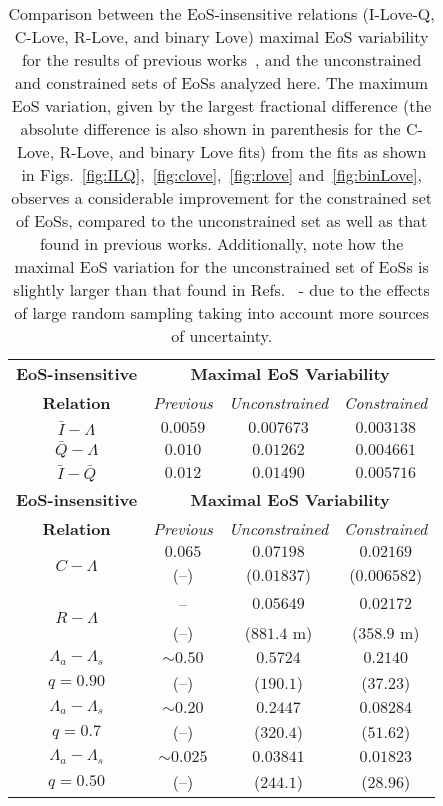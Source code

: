 \documentclass[prd,twocolumn,nofootinbib,superscriptaddress,amsmath,amssymb]{revtex4-1}
\begin{document}
\begin{table}
\centering
\caption{
Comparison between the EoS-insensitive relations (I-Love-Q, C-Love, R-Love, and binary Love) maximal EoS variability for the results of previous works~\cite{Yagi:ILQ,Yagi:binLove}, and the unconstrained and constrained sets of EoSs analyzed here. 
The maximum EoS variation, given by the largest fractional difference (the absolute difference is also shown in parenthesis for the C-Love, R-Love, and binary Love fits) from the fits as shown in Figs.~\ref{fig:ILQ},~\ref{fig:clove},~\ref{fig:rlove} and~\ref{fig:binLove}, observes a considerable improvement for the constrained set of EoSs, compared to the unconstrained set as well as that found in previous works.
Additionally, note how the maximal EoS variation for the unconstrained set of EoSs is slightly larger than that found in Refs.~\cite{Yagi:ILQ,Yagi:binLove} - due to the effects of large random sampling taking into account more sources of uncertainty.
}\label{tab:maxVar}
\begin{tabular}{ c  || c c c } 
 \hline
 \hline
 \textbf{EoS-insensitive} & \multicolumn{3}{c}{\textbf{Maximal EoS Variability}} \\
 \cline{2-4}
 \textbf{Relation} & \multicolumn{1}{c|}{\emph{Previous}} & \multicolumn{1}{c|}{\emph{Unconstrained}} & \emph{Constrained}\\
 \hline
 $\bar{I}-\Lambda$ &  $0.0059$ & $0.007673$ & $0.003138$\\
 $\bar{Q}-\Lambda$ & $0.010$ & $0.01262$ & $0.004661$\\
 $\bar{I}-\bar{Q}$ & $0.012$ & $0.01490$ & $0.005716$\\
 \hline
 \noalign{\smallskip}
\noalign{\smallskip}
 \noalign{\smallskip}
\noalign{\smallskip}
\hline
 \hline
 \textbf{EoS-insensitive} & \multicolumn{3}{c}{\textbf{Maximal EoS Variability}} \\
 \cline{2-4}
 \textbf{Relation} & \multicolumn{1}{c|}{\emph{Previous}} & \multicolumn{1}{c|}{\emph{Unconstrained}} & \emph{Constrained}\\
 \hline
 \multirow{2}{*}{$C-\Lambda$} & $0.065$ & $0.07198$ & $0.02169$\\
 & (--) & ($0.01837$) & ($0.006582$)\\
  \hline
 \multirow{2}{*}{$R-\Lambda$} & -- & $0.05649$ & $0.02172$\\
 & (--) & ($881.4 \text{ m}$) & ($358.9 \text{ m}$) \\
 \hline
 $\Lambda_a-\Lambda_s$ & $\sim0.50$ & $0.5724$ & $0.2140$\\
 $q=0.90$ & (--) & ($190.1$) & ($37.23$) \\
 \cline{1-1}
 $\Lambda_a-\Lambda_s$ & $\sim0.20$ & $0.2447$ & $0.08284$\\
  $q=0.7$ & (--) & ($320.4$) & ($51.62$) \\
  \cline{1-1}
 $\Lambda_a-\Lambda_s$ & $\sim0.025$ & $0.03841$ & $0.01823$\\
  $q=0.50$ & (--) & ($244.1$) & ($28.96$) \\
  \cline{1-1}
\hline
\hline
\end{tabular}
\end{table}
\end{document}
